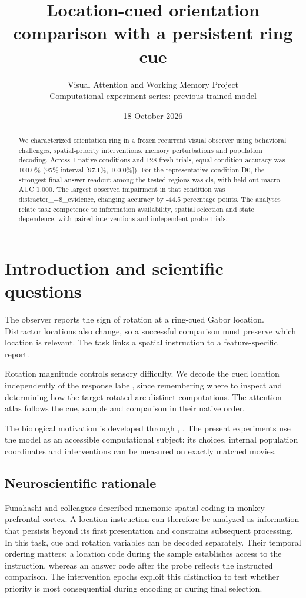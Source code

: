 \documentclass[11pt]{article}
\begin{document}
\title{\color{ink}Location-cued orientation comparison with a persistent ring cue}
\author{Visual Attention and Working Memory Project\\Computational experiment series: previous trained model}\date{18 October 2026}\maketitle
\begin{abstract}
We characterized orientation ring in a frozen recurrent visual observer using behavioral challenges, spatial-priority interventions, memory perturbations and population decoding. Across 1 native conditions and 128 fresh trials, equal-condition accuracy was 100.0\% (95\% interval [97.1\%, 100.0\%]). For the representative condition D0, the strongest final answer readout among the tested regions was cls, with held-out macro AUC 1.000. The largest observed impairment in that condition was distractor\_\allowbreak{}+8\_\allowbreak{}evidence, changing accuracy by -44.5 percentage points. The analyses relate task competence to information availability, spatial selection and state dependence, with paired interventions and independent probe trials.
\end{abstract}
\section{Introduction and scientific questions}
The observer reports the sign of rotation at a ring-cued Gabor location. Distractor locations also change, so a successful comparison must preserve which location is relevant. The task links a spatial instruction to a feature-specific report.

Rotation magnitude controls sensory difficulty. We decode the cued location independently of the response label, since remembering where to inspect and determining how the target rotated are distinct computations. The attention atlas follows the cue, sample and comparison in their native order.

The biological motivation is developed through \cite{spatial}, \cite{normalization}. The present experiments use the model as an accessible computational subject: its choices, internal population coordinates and interventions can be measured on exactly matched movies.

\subsection{Neuroscientific rationale}
Funahashi and colleagues described mnemonic spatial coding in monkey prefrontal cortex. A location instruction can therefore be analyzed as information that persists beyond its first presentation and constrains subsequent processing. In this task, cue and rotation variables can be decoded separately. Their temporal ordering matters: a location code during the sample establishes access to the instruction, whereas an answer code after the probe reflects the instructed comparison. The intervention epochs exploit this distinction to test whether priority is most consequential during encoding or during final selection.
\end{document}
